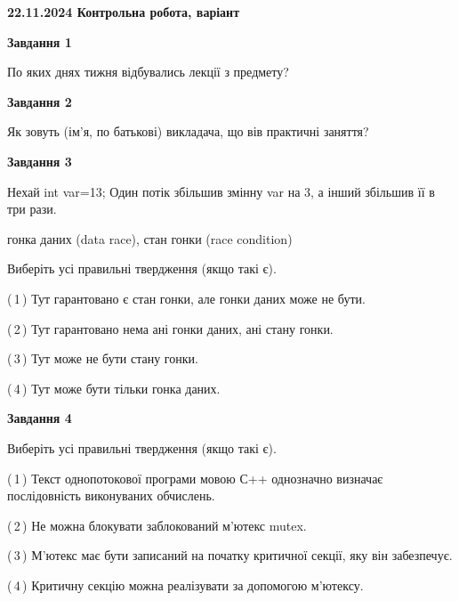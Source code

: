\documentclass[12pt, ukrainian]{article}
\begin{document}
\begin {large}

\textbf{22.11.2024 Контрольна робота, варіант  }\par


{

\begin{center}
\textbf{Завдання 1}
\end{center}

По яких днях тижня відбувались лекції з предмету?


\begin{center}
\textbf{Завдання 2}
\end{center}

Як зовуть (ім'я, по батькові) викладача, що вів практичні заняття?


\begin{center}
\textbf{Завдання 3}
\end{center}

Нехай int var=13; Один потік збільшив змінну var на 3, а інший збільшив її в три рази.

гонка даних (data race), стан гонки (race condition)

Виберіть усі правильні твердження (якщо такі є).\par
\vspace{2mm}
(\,1\,) Тут гарантовано є стан гонки, але гонки даних може не бути.%

(\,2\,) Тут гарантовано нема ані гонки даних, ані стану гонки.%

(\,3\,) Тут може не бути стану гонки.%

(\,4\,) Тут може бути тільки гонка даних.%


\begin{center}
\textbf{Завдання 4}
\end{center}

Виберіть усі правильні твердження (якщо такі є).\par
\vspace{2mm}

(\,1\,) Текст однопотокової програми мовою С++ однозначно визначає послідовність виконуваних обчислень.%

(\,2\,) Не можна блокувати заблокований м’ютекс mutex.%

(\,3\,) М’ютекс має бути записаний на початку критичної секції, яку він забезпечує.%

(\,4\,) Критичну секцію можна реалізувати за допомогою м’ютексу.%


}
\end{large}
\end{document}
